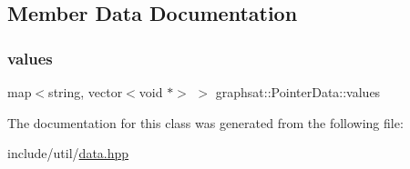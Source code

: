 \subsection{Member Data Documentation}
\mbox{\label{classgraphsat_1_1_pointer_data_ad0048e39af1eeb839e0d0c5ef2e4051a}} 
\subsubsection{\texorpdfstring{values}{values}}
{\footnotesize\ttfamily map$<$string, vector$<$void $\ast$$>$ $>$ graphsat\+::\+Pointer\+Data\+::values\hspace{0.3cm}{\ttfamily [private]}}



The documentation for this class was generated from the following file\+:\begin{DoxyCompactItemize}
\item 
include/util/\mbox{\hyperlink{data_8hpp}{data.\+hpp}}\end{DoxyCompactItemize}
